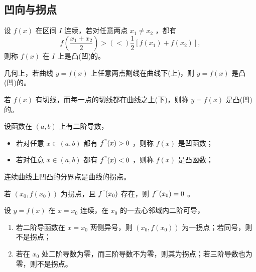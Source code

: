 \subsection{凹向与拐点}

\begin{Def}[凹凸性]

    设 $ f(x) $ 在区间 $ I $ 连续，若对任意两点 $ x_1 \neq x_2 $ ，都有$$
        f(\frac{x_1+x_2}{2})>(<)\frac{1}{2}[f(x_1)+f(x_2)],
    $$ 则称 $ f(x) $ 在 $ I $ 上是凸(凹)的。
\end{Def}

几何上，若曲线 $ y=f(x) $ 上任意两点割线在曲线下(上)，则 $ y=f(x) $ 是凸(凹)的。

若 $ f(x) $ 有切线，而每一点的切线都在曲线之上(下)，则称 $ y=f(x) $ 是凸(凹)的。

\begin{Theo}[凹凸判定定理]

    设函数在 $ (a,b) $ 上有二阶导数，\begin{itemize}
        \item 若对任意 $ x\in (a,b) $ 都有 $ f^"(x)>0 $ ，则称 $ f(x) $ 是凹函数；
        \item 若对任意 $ x\in (a,b) $ 都有 $ f^"(x)<0 $ ，则称 $ f(x) $ 是凸函数；
    \end{itemize}
\end{Theo}

\begin{Def}[拐点]

    连续曲线上凹凸的分界点是曲线的拐点。
\end{Def}

\begin{Theo}[二阶可导点为拐点的必要条件]

    若 $ (x_0,f(x_0)) $ 为拐点，且 $ f^"(x_0) $ 存在，则 $ f^"(x_0)=0 $ 。
\end{Theo}

\begin{Theo}[二阶可导点为拐点的充分条件]

    设 $ y=f(x) $ 在 $ x=x_0 $ 连续，在 $ x_0 $ 的一去心邻域内二阶可导，\begin{enumerate}
        \item 若二阶导函数在 $ x=x_0 $ 两侧异号，则 $ (x_0,f(x_0)) $ 为一拐点；若同号，则不是拐点；
        \item 若在 $ x_0 $ 处二阶导数为零，而三阶导数不为零，则其为拐点；若三阶导数也为零，则不是拐点。
    \end{enumerate}
\end{Theo}

